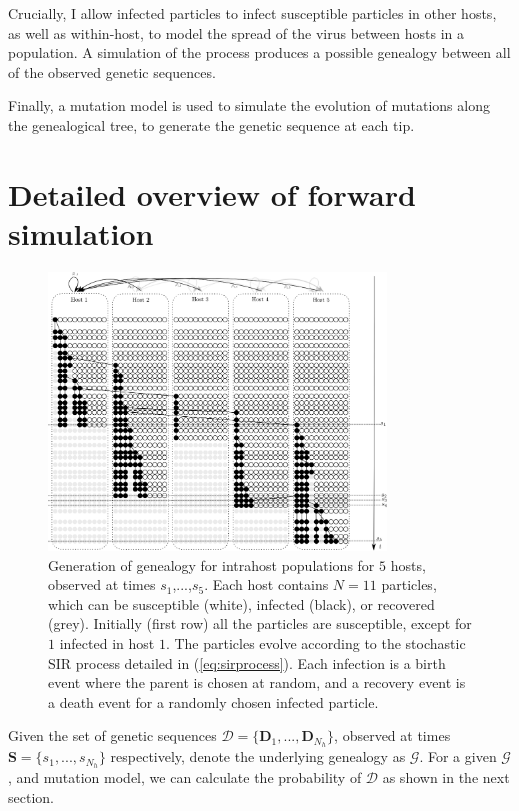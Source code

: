 \documentclass[]{report}
\begin{document}
Crucially, I allow infected particles to infect susceptible particles in other hosts, as well as within-host, to model the spread of the virus between hosts in a population. A simulation of the process produces a possible genealogy between all of the observed genetic sequences.

Finally, a mutation model is used to simulate the evolution of mutations along the genealogical tree, to generate the genetic sequence at each tip.

\section{Detailed overview of forward simulation} 

\begin{figure}[h]
\centering
\includegraphics[width=0.8\textwidth]{model_1.eps}
\caption{Generation of genealogy for intrahost populations for $5$ hosts, observed at times $s_1$,...,$s_5$. Each host contains $N=11$ particles, which can be susceptible (white), infected (black), or recovered (grey). Initially (first row) all the particles are susceptible, except for $1$ infected in host $1$. The particles evolve according to the stochastic SIR process detailed in (\ref{eq:sirprocess}). Each infection is a birth event where the parent is chosen at random, and a recovery event is a death event for a randomly chosen infected particle.
}\end{figure}
Given the set of genetic sequences $\mathcal{D} = \{\mathbf{D}_1,...,\mathbf{D}_{N_h}\}$, observed at times $\mathbf{S} = \{s_1,...,s_{N_h}\}$ respectively, denote the underlying genealogy as $\mathcal{G}$. 
For a given $\mathcal{G}$, and mutation model, we can calculate the probability of $\mathcal{D}$ as shown in the next section. 
\end{document}
